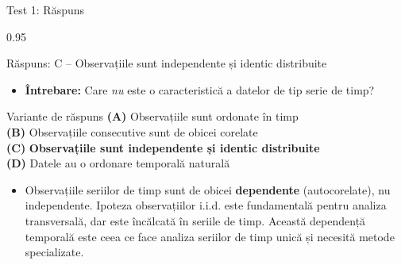 \documentclass[9pt, aspectratio=169, t]{beamer}
\begin{document}
\begin{frame}{Test 1: Răspuns}
    \begin{cminipage}{0.95\textwidth}
    \begin{exampleblock}{Răspuns: C -- Observațiile sunt independente și identic distribuite}
        \begin{itemize}\setlength{\itemsep}{0pt}
            \item \textbf{Întrebare:} Care \emph{nu} este o caracteristică a datelor de tip serie de timp?
        \end{itemize}

        \vspace{0.3cm}

        \begin{block}{Variante de răspuns}
        \textcolor{MainBlue}{\textbf{(A)}} Observațiile sunt ordonate în timp \incorrect\\[3pt]
        \textcolor{MainBlue}{\textbf{(B)}} Observațiile consecutive sunt de obicei corelate \incorrect\\[3pt]
        \textcolor{MainBlue}{\textbf{(C)}} \textbf{\textcolor{Forest}{Observațiile sunt independente și identic distribuite}} \correct\\[3pt]
        \textcolor{MainBlue}{\textbf{(D)}} Datele au o ordonare temporală naturală \incorrect
        \end{block}
        \vspace{0.3cm}
        \begin{itemize}\setlength{\itemsep}{0pt}
            \item Observațiile seriilor de timp sunt de obicei \textbf{dependente} (autocorelate), nu independente. Ipoteza observațiilor i.i.d. este fundamentală pentru analiza transversală, dar este încălcată în seriile de timp. Această dependență temporală este ceea ce face analiza seriilor de timp unică și necesită metode specializate.
        \end{itemize}
    \end{exampleblock}
    \end{cminipage}
\end{frame}
\end{document}
